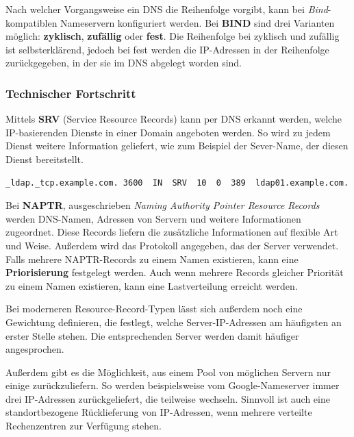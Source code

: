 Nach welcher Vorgangsweise ein DNS die Reihenfolge vorgibt, kann bei
\textit{Bind}-kompatiblen Nameservern konfiguriert werden. Bei \textbf{BIND} sind drei Varianten möglich: \textbf{zyklisch}, \textbf{zufällig} oder \textbf{fest}. Die Reihenfolge bei zyklisch und zufällig ist selbsterklärend, jedoch bei fest werden die IP-Adressen in der Reihenfolge zurückgegeben, in der sie im DNS abgelegt worden sind.

\subsubsection{Technischer Fortschritt}\cite{SRVResourceRecord}
Mittels \textbf{SRV} (Service Resource Records) kann per DNS erkannt werden, welche IP-basierenden Dienste in einer Domain angeboten werden. So wird zu jedem Dienst weitere Information geliefert, wie zum Beispiel der Sever-Name, der diesen Dienst bereitstellt.

\begin{center}
	
	\begin{lstlisting}[caption=SRV - (Service) Resource Records]
	_ldap._tcp.example.com. 3600  IN  SRV  10  0  389  ldap01.example.com.
	\end{lstlisting}
\end{center}


Bei \textbf{NAPTR}, ausgeschrieben \textit{Naming Authority Pointer Resource Records}
werden DNS-Namen, Adressen von Servern und weitere Informationen zugeordnet. Diese Records liefern die zusätzliche Informationen auf flexible Art und Weise. Außerdem wird das Protokoll angegeben, das der Server verwendet. Falls mehrere NAPTR-Records zu einem Namen existieren, kann eine \textbf{Priorisierung} festgelegt werden. Auch wenn mehrere Records gleicher Priorität zu einem Namen existieren, kann eine Lastverteilung erreicht werden.

Bei moderneren Resource-Record-Typen lässt sich außerdem noch eine Gewichtung definieren, die festlegt, welche Server-IP-Adressen am häufigsten an erster Stelle stehen. Die entsprechenden Server werden damit häufiger angesprochen.

Außerdem gibt es die Möglichkeit, aus einem Pool von möglichen Servern nur einige zurückzuliefern. So werden beispielsweise vom Google-Nameserver immer drei IP-Adressen zurückgeliefert, die teilweise wechseln. Sinnvoll ist auch eine standortbezogene Rücklieferung von IP-Adressen, wenn mehrere verteilte Rechenzentren zur Verfügung stehen.

